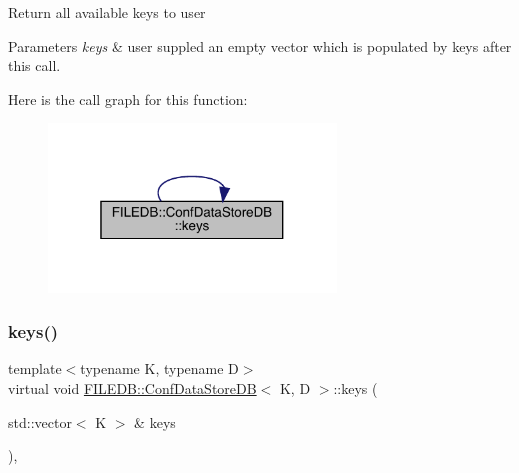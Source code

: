 Return all available keys to user 
\begin{DoxyParams}{Parameters}
{\em keys} & user suppled an empty vector which is populated by keys after this call. \\
\hline
\end{DoxyParams}
Here is the call graph for this function\+:
\nopagebreak
\begin{figure}[H]
\begin{center}
\leavevmode
\includegraphics[width=217pt]{d8/d19/classFILEDB_1_1ConfDataStoreDB_a794e05e3888ab95e0396a196b5a18e65_cgraph}
\end{center}
\end{figure}
\mbox{\label{classFILEDB_1_1ConfDataStoreDB_a794e05e3888ab95e0396a196b5a18e65}} 
\subsubsection{\texorpdfstring{keys()}{keys()}\hspace{0.1cm}{\footnotesize\ttfamily [3/3]}}
{\footnotesize\ttfamily template$<$typename K, typename D$>$ \\
virtual void \mbox{\hyperlink{classFILEDB_1_1ConfDataStoreDB}{F\+I\+L\+E\+D\+B\+::\+Conf\+Data\+Store\+DB}}$<$ K, D $>$\+::keys (\begin{DoxyParamCaption}\item[{std\+::vector$<$ K $>$ \&}]{keys }\end{DoxyParamCaption})\hspace{0.3cm}{\ttfamily [inline]}, {\ttfamily [virtual]}}

